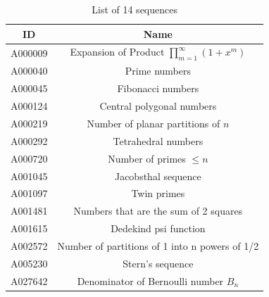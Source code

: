 \documentclass[t,usenames,dvipsnames]{beamer} %
\newcommand{\1}{\boldsymbol{1}}
\newcommand{\0}{\boldsymbol{0}}
\begin{document}
\begin{frame}
\begin{table}[h]
\centering
\begin{tabular}{cc}
\hline
ID & Name \\
\hline
A000009 
& Expansion of Product  \(\prod\limits_{m = 1}^\infty (1 + x^m)\) \\
A000040 & Prime numbers \\
A000045 & Fibonacci numbers \\
A000124 & Central polygonal numbers \\
A000219 & Number of planar partitions of $n$ \\
A000292 & Tetrahedral numbers \\
A000720 & Number of primes $\le n$ \\
A001045 & Jacobsthal sequence \\
A001097 & Twin primes \\
A001481 & Numbers that are the sum of 2 squares \\
A001615 & Dedekind psi function \\
A002572 & Number of partitions of 1 into n powers of 1/2 \\
A005230 & Stern's sequence \\
A027642 & Denominator of Bernoulli number $B_n$ \\
\hline
\end{tabular}
\caption{List of 14 sequences}
\end{table}
\end{frame}
\end{document}

